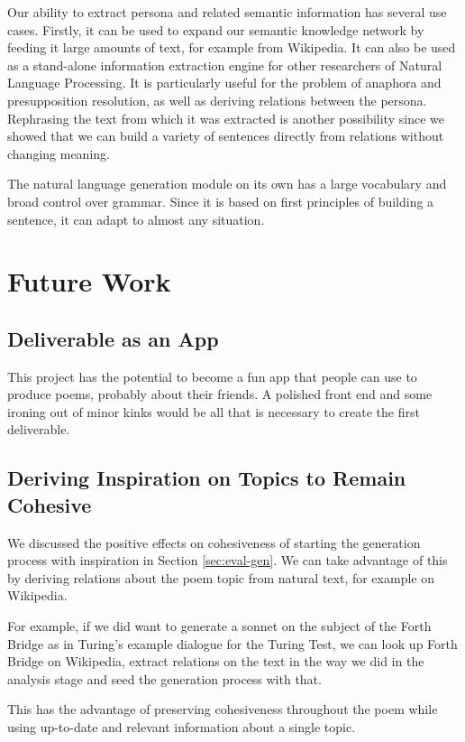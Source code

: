 Our ability to extract persona and related semantic information has several use cases. Firstly, it can be used to expand our semantic knowledge network by feeding it large amounts of text, for example from Wikipedia. It can also be used as a stand-alone information extraction engine for other researchers of Natural Language Processing. It is particularly useful for the problem of anaphora and presupposition resolution, as well as deriving relations between the persona. Rephrasing the text from which it was extracted is another possibility since we showed that we can build a variety of sentences directly from relations without changing meaning.

The natural language generation module on its own has a large vocabulary and broad control over grammar. Since it is based on first principles of building a sentence, it can adapt to almost any situation.

\section{Future Work}

\subsection{Deliverable as an App}
This project has the potential to become a fun app that people can use to produce poems, probably about their friends. A  polished front end and some ironing out of minor kinks would be all that is necessary to create the first deliverable.

\subsection{Deriving Inspiration on Topics to Remain Cohesive}
We discussed the positive effects on cohesiveness of starting the generation process with inspiration in Section \ref{sec:eval-gen}. We can take advantage of this by deriving relations about the poem topic from natural text, for example on Wikipedia.

For example, if we did want to generate a sonnet on the subject of the Forth Bridge as in Turing's example dialogue for the Turing Test\cite{turing1950computing}, we can look up Forth Bridge on Wikipedia, extract relations on the text in the way we did in the analysis stage and seed the generation process with that.

This has the advantage of preserving cohesiveness throughout the poem while using up-to-date and relevant information about a single topic.


